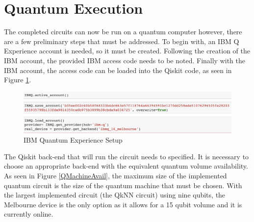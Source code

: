 \section{Quantum Execution}
The completed circuits can now be run on a quantum computer however, there are a few preliminary steps that must be addressed.
To begin with, an IBM Q Experience account is needed, so it must be created. %
Following the creation of the IBM account, the provided IBM access code  needs to be noted. %
Finally with the IBM account, the access code can be loaded into the Qiskit code, as seen in Figure \ref{IBMSet}. 

\begin{figure}[H]
      \centering
      \includegraphics[scale=0.5]{background/IBMStart.png}
      \caption{IBM Quantum Experience Setup }
      \label{IBMSet}
\end{figure}

The Qiskit back-end that will run the circuit needs to specified. It is necessary to choose an appropriate back-end with the equivalent quantum volume availability. As seen in Figure \ref{QMachineAvail},  the maximum size of the implemented quantum circuit is the size of the quantum machine that must be chosen. 
With the largest implemented circuit (the QkNN circuit) using nine qubits, the Melbourne device is the only option as it allows for a 15 qubit volume and it is currently online. 



